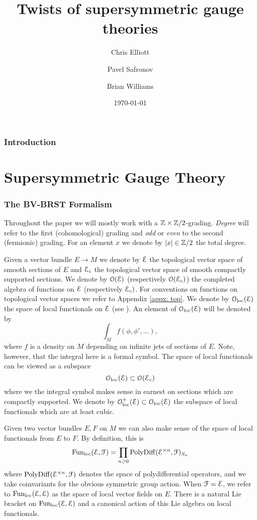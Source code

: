 \documentclass[10pt, oneside]{article}
\title{Twists of supersymmetric gauge theories}
\author{Chris Elliott\and Pavel Safronov \and Brian Williams}
\date{\today}
\begin{document}
\maketitle

\tableofcontents

\section*{Introduction}

\part{Supersymmetric Gauge Theory}

\section{The BV-BRST Formalism}

Throughout the paper we will mostly work with a $\mathbb Z\times\mathbb Z/2$-grading. \emph{Degree} will refer to the first (cohomological) grading and \emph{odd} or \emph{even} to the second (fermionic) grading. For an element $x$ we denote by $|x|\in\mathbb Z/2$ the total degree.

Given a vector bundle $E\rightarrow M$ we denote by $\mathcal E$ the topological vector space of smooth sections of $E$ and $\mathcal E_c$ the topological vector space of smooth compactly supported sections.
We denote by $\mathcal O(\mathcal E)$ (respectively $\mathcal O(\mathcal E_c)$) the completed algebra of functions on $\mathcal E$ (respectively $\mathcal E_c)$. 
For conventions on functions on topological vector spaces we refer to Appendix \ref{appx: top}. 
We denote by $\mathcal{O}_{\rm loc}(\mathcal E)$ the space of local functionals on $\mathcal E$ (see \cite[Definition 4.5.1.1]{Book2}). An element of $\mathcal{O}_{\rm loc}(\mathcal E)$ will be denoted by
\[\int_M f (\phi, \phi', \dots),\]
where $f$ is a density on $M$ depending on infinite jets of sections of $E$. Note, however, that the integral here is a formal symbol. 
The space of local functionals can be viewed as a subspace
\[
\mathcal{O}_{\rm loc}(\mathcal E) \subset \mathcal O(\mathcal E_c)
\]
where we the integral symbol makes sense in earnest on sections which are compactly supported.
We denote by $\mathcal{O}_{\rm loc}^+(\mathcal E)\subset \mathcal{O}_{\rm loc}(\mathcal E)$ the subspace of local functionals which are at least cubic.

Given two vector bundles $E, F$ on $M$ we can also make sense of the space of local functionals from $E$ to $F$.
By definition, this is 
\[
{\rm Fun}_{\rm loc}(\mathcal E, \mathcal F) = \prod_{n \geq 0} {\rm PolyDiff}(\mathcal E^{\times n}, \mathcal F)_{S_n}
\]
where ${\rm PolyDiff}(\mathcal E^{\times n}, \mathcal F)$ denotes the space of polydifferential operators, and we take coinvariants for the obvious symmetric group action.
When $\mathcal F = \mathcal E$, we refer to ${\rm Fun}_{\rm loc}(\mathcal E, \mathcal E)$ as the space of local vector fields on $E$. 
There is a natural Lie bracket on ${\rm Fun}_{\rm loc}(\mathcal E, \mathcal E)$ and a canonical action of this Lie algebra on local functionals. 
\end{document}
